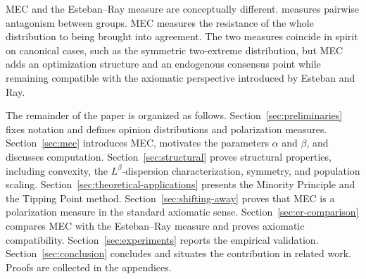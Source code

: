 MEC and the Esteban--Ray measure are conceptually different.
\ERLabel{} measures pairwise antagonism between groups. MEC measures
the resistance of the whole distribution to being brought into
agreement. The two measures coincide in spirit on canonical cases,
such as the symmetric two-extreme distribution, but MEC adds an
optimization structure and an endogenous consensus point while
remaining compatible with the axiomatic perspective introduced by
Esteban and Ray.

The remainder of the paper is organized as follows.
Section~\ref{sec:preliminaries} fixes notation and defines opinion
distributions and polarization measures. Section~\ref{sec:mec}
introduces MEC, motivates the parameters \(\alpha\) and \(\beta\), and
discusses computation. Section~\ref{sec:structural} proves structural
properties, including convexity, the \(L^\beta\)-dispersion
characterization, symmetry, and population scaling.
Section~\ref{sec:theoretical-applications} presents the Minority
Principle and the Tipping Point method.
Section~\ref{sec:shifting-away} proves that MEC is a polarization
measure in the standard axiomatic sense.
Section~\ref{sec:er-comparison} compares MEC with the Esteban--Ray
measure and proves axiomatic compatibility.
Section~\ref{sec:experiments} reports the empirical validation.
Section~\ref{sec:conclusion} concludes and situates the contribution
in related work.
Proofs are collected in the appendices.
